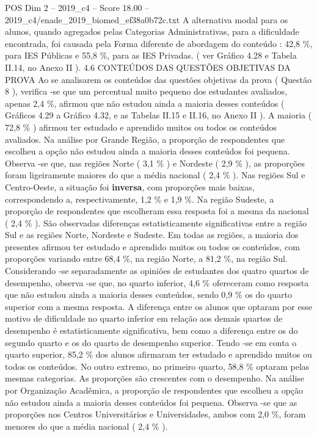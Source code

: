 \begin{textsample}{POS Dim 2 – 2019\_c4 – Score 18.00 – 2019\_c4/enade\_2019\_biomed\_ef38a0b72c.txt}
A alternativa modal para os alunos, quando agregados pelas Categorias Administrativas, para a dificuldade encontrada, foi causada pela Forma diferente de abordagem do conteúdo : 42,8 \%, para IES Públicas e 55,8 \%, para as IES Privadas. ( ver Gráfico 4.28 e Tabela II.14, no Anexo II ). 4.6 CONTEÚDOS DAS QUESTÕES OBJETIVAS DA PROVA Ao se analisarem os conteúdos das questões objetivas da prova ( Questão 8 ), verifica -se que um percentual muito pequeno dos estudantes avaliados, apenas 2,4 \%, afirmou que não estudou ainda a maioria desses conteúdos ( Gráficos 4.29 a Gráfico 4.32, e as Tabelas II.15 e II.16, no Anexo II ).
A maioria ( 72,8 \% ) afirmou ter estudado e aprendido muitos ou todos os conteúdos avaliados.
Na análise por Grande Região, a proporção de respondentes que escolheu a opção não estudou ainda a maioria desses conteúdos foi pequena.
Observa -se que, nas regiões Norte ( 3,1 \% ) e Nordeste ( 2,9 \% ), as proporções foram ligeiramente maiores do que a média nacional ( 2,4 \% ).
Nas regiões Sul e Centro-Oeste, a situação foi \textbf{inversa}, com proporções mais baixas, correspondendo a, respectivamente, 1,2 \% e 1,9 \%.
Na região Sudeste, a proporção de respondentes que escolheram essa resposta foi a mesma da nacional ( 2,4 \% ).
São observadas diferenças estatisticamente significativas entre a região Sul e as regiões Norte, Nordeste e Sudeste.
Em todas as regiões, a maioria dos presentes afirmou ter estudado e aprendido muitos ou todos os conteúdos, com proporções variando entre 68,4 \%, na região Norte, a 81,2 \%, na região Sul.
Considerando -se separadamente as opiniões de estudantes dos quatro quartos de desempenho, observa -se que, no quarto inferior, 4,6 \% ofereceram como resposta que não estudou ainda a maioria desses conteúdos, sendo 0,9 \% os do quarto superior com a mesma resposta.
A diferença entre os alunos que optaram por esse motivo de dificuldade no quarto inferior em relação aos demais quartos de desempenho é estatisticamente significativa, bem como a diferença entre os do segundo quarto e os do quarto de desempenho superior.
Tendo -se em conta o quarto superior, 85,2 \% dos alunos afirmaram ter estudado e aprendido muitos ou todos os conteúdos.
No outro extremo, no primeiro quarto, 58,8 \% optaram pelas mesmas categorias.
As proporções são crescentes com o desempenho.
Na análise por Organização Acadêmica, a proporção de respondentes que escolheu a opção não estudou ainda a maioria desses conteúdos foi pequena.
Observa -se que as proporções nos Centros Universitários e Universidades, ambos com 2,0 \%, foram menores do que a média nacional ( 2,4 \% ).

\end{textsample}
